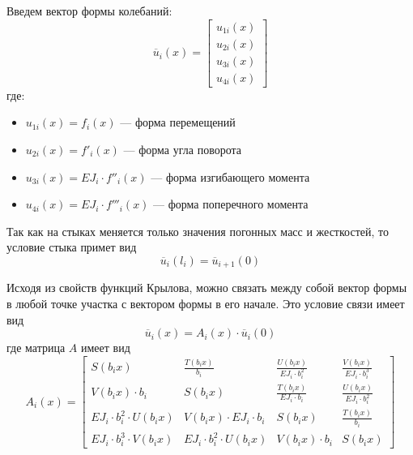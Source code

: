 Введем вектор формы колебаний:
\begin{equation}
    \label{eq6}
    \overline{u}_i(x) = 
    \begin{bmatrix}
        u_{1i}(x)
        \\
        u_{2i}(x)
        \\
        u_{3i}(x)
        \\
        u_{4i}(x)
    \end{bmatrix}
\end{equation}
где:
\begin{itemize}
    \item $u_{1i}(x) = f_i(x)$ --- форма перемещений
    \item $u_{2i}(x) = f'_i(x)$ --- форма угла поворота
    \item $u_{3i}(x) = EJ_i \cdot f''_i(x)$ --- форма изгибающего момента
    \item $u_{4i}(x) = EJ_i \cdot f'''_i(x)$ --- форма поперечного момента
\end{itemize}

Так как на стыках меняется только значения погонных масс и жесткостей, то условие стыка примет вид
\begin{equation}
    \label{eq7}
    \overline{u}_i(l_i) = \overline{u}_{i+1}(0)
\end{equation}

Исходя из свойств функций Крылова, можно связать между собой вектор формы в любой точке участка с вектором формы в его начале. Это условие связи имеет вид
\begin{equation}
    \label{eq8}
    \overline{u}_i(x) = A_i(x) \cdot \overline{u}_i(0)
\end{equation}
где матрица $A$ имеет вид
\begin{equation}
    \label{eq9}
    A_i(x) = 
    \begin{bmatrix}
        S(b_ix) & \displaystyle \frac{T(b_ix)}{b_i} & \displaystyle \frac{U(b_ix)}{EJ_i \cdot b_i^2} & \displaystyle \frac{V(b_ix)}{EJ_i \cdot b_i^3}
        \\[10pt]
        V(b_ix) \cdot b_i & S(b_ix) & \displaystyle \frac{T(b_ix)}{EJ_i \cdot b_i} & \displaystyle \frac{U(b_ix)}{EJ_i \cdot b_i^2}
        \\[10pt]
        EJ_i \cdot b_i^2 \cdot U(b_ix) & V(b_ix) \cdot EJ_i \cdot b_i & S(b_ix) & \displaystyle \frac{T(b_ix)}{b_i}
        \\[10pt]
        EJ_i \cdot b_i^3 \cdot V(b_ix) & EJ_i \cdot b_i^2 \cdot U(b_ix) & V(b_ix) \cdot b_i & S(b_ix)
    \end{bmatrix}
\end{equation}

